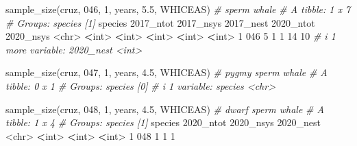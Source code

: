 \documentclass[
]{book}
\newenvironment{Shaded}{\begin{snugshade}}{\end{snugshade}}
\newcommand{\AttributeTok}[1]{\textcolor[rgb]{0.77,0.63,0.00}{#1}}
\newcommand{\CommentTok}[1]{\textcolor[rgb]{0.56,0.35,0.01}{\textit{#1}}}
\newcommand{\DecValTok}[1]{\textcolor[rgb]{0.00,0.00,0.81}{#1}}
\newcommand{\ErrorTok}[1]{\textcolor[rgb]{0.64,0.00,0.00}{\textbf{#1}}}
\newcommand{\FloatTok}[1]{\textcolor[rgb]{0.00,0.00,0.81}{#1}}
\newcommand{\FunctionTok}[1]{\textcolor[rgb]{0.00,0.00,0.00}{#1}}
\newcommand{\NormalTok}[1]{#1}
\newcommand{\SpecialCharTok}[1]{\textcolor[rgb]{0.00,0.00,0.00}{#1}}
\newcommand{\StringTok}[1]{\textcolor[rgb]{0.31,0.60,0.02}{#1}}
\begin{document}
\begin{Shaded}
\begin{Highlighting}[]
\FunctionTok{sample\_size}\NormalTok{(cruz, }\StringTok{\textquotesingle{}046\textquotesingle{}}\NormalTok{, }\DecValTok{1}\NormalTok{, years, }\FloatTok{5.5}\NormalTok{, }\StringTok{\textquotesingle{}WHICEAS\textquotesingle{}}\NormalTok{) }\CommentTok{\# sperm whale}
\CommentTok{\# A tibble: 1 x 7}
\CommentTok{\# Groups:   species [1]}
\NormalTok{  species }\StringTok{\textasciigrave{}}\AttributeTok{2017\_ntot}\StringTok{\textasciigrave{}} \StringTok{\textasciigrave{}}\AttributeTok{2017\_nsys}\StringTok{\textasciigrave{}} \StringTok{\textasciigrave{}}\AttributeTok{2017\_nest}\StringTok{\textasciigrave{}} \StringTok{\textasciigrave{}}\AttributeTok{2020\_ntot}\StringTok{\textasciigrave{}} \StringTok{\textasciigrave{}}\AttributeTok{2020\_nsys}\StringTok{\textasciigrave{}}
  \SpecialCharTok{\textless{}}\NormalTok{chr}\SpecialCharTok{\textgreater{}}         \ErrorTok{\textless{}}\NormalTok{int}\SpecialCharTok{\textgreater{}}       \ErrorTok{\textless{}}\NormalTok{int}\SpecialCharTok{\textgreater{}}       \ErrorTok{\textless{}}\NormalTok{int}\SpecialCharTok{\textgreater{}}       \ErrorTok{\textless{}}\NormalTok{int}\SpecialCharTok{\textgreater{}}       \ErrorTok{\textless{}}\NormalTok{int}\SpecialCharTok{\textgreater{}}
\DecValTok{1} \DecValTok{046}               \DecValTok{5}           \DecValTok{1}           \DecValTok{1}          \DecValTok{14}          \DecValTok{10}
\CommentTok{\# i 1 more variable: \textasciigrave{}2020\_nest\textasciigrave{} \textless{}int\textgreater{}}

\FunctionTok{sample\_size}\NormalTok{(cruz, }\StringTok{\textquotesingle{}047\textquotesingle{}}\NormalTok{, }\DecValTok{1}\NormalTok{, years, }\FloatTok{4.5}\NormalTok{, }\StringTok{\textquotesingle{}WHICEAS\textquotesingle{}}\NormalTok{) }\CommentTok{\# pygmy sperm whale}
\CommentTok{\# A tibble: 0 x 1}
\CommentTok{\# Groups:   species [0]}
\CommentTok{\# i 1 variable: species \textless{}chr\textgreater{}}

\FunctionTok{sample\_size}\NormalTok{(cruz, }\StringTok{\textquotesingle{}048\textquotesingle{}}\NormalTok{, }\DecValTok{1}\NormalTok{, years, }\FloatTok{4.5}\NormalTok{, }\StringTok{\textquotesingle{}WHICEAS\textquotesingle{}}\NormalTok{) }\CommentTok{\# dwarf sperm whale}
\CommentTok{\# A tibble: 1 x 4}
\CommentTok{\# Groups:   species [1]}
\NormalTok{  species }\StringTok{\textasciigrave{}}\AttributeTok{2020\_ntot}\StringTok{\textasciigrave{}} \StringTok{\textasciigrave{}}\AttributeTok{2020\_nsys}\StringTok{\textasciigrave{}} \StringTok{\textasciigrave{}}\AttributeTok{2020\_nest}\StringTok{\textasciigrave{}}
  \SpecialCharTok{\textless{}}\NormalTok{chr}\SpecialCharTok{\textgreater{}}         \ErrorTok{\textless{}}\NormalTok{int}\SpecialCharTok{\textgreater{}}       \ErrorTok{\textless{}}\NormalTok{int}\SpecialCharTok{\textgreater{}}       \ErrorTok{\textless{}}\NormalTok{int}\SpecialCharTok{\textgreater{}}
\DecValTok{1} \DecValTok{048}               \DecValTok{1}           \DecValTok{1}           \DecValTok{1}


\end{Highlighting}
\end{Shaded}
\end{document}

